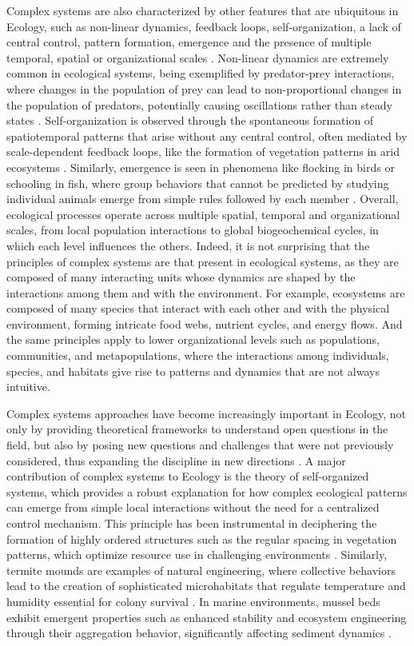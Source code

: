 Complex systems are also characterized by other features that are ubiquitous in
Ecology, such as non-linear dynamics, feedback loops, self-organization, a lack
of central control, pattern formation, emergence and the presence of multiple
temporal, spatial or organizational scales \cite{Bianconi_2023}. Non-linear
dynamics are extremely common in ecological systems, being exemplified by
predator-prey interactions, where changes in the population of prey can lead to
non-proportional changes in the population of predators, potentially causing
oscillations rather than steady states \cite{Lotka1925}. Self-organization is
observed through the spontaneous formation of spatiotemporal patterns that
arise without any central control, often mediated by scale-dependent feedback
loops, like the formation of vegetation patterns in arid ecosystems
\cite{Rietkerk2008}. Similarly, emergence is seen in phenomena like flocking in
birds or schooling in fish, where group behaviors that cannot be predicted by
studying individual animals emerge from simple rules followed by each member
\cite{Vicsek1995}. Overall, ecological processes operate across multiple
spatial, temporal and organizational scales, from local population interactions
to global biogeochemical cycles, in which each level influences the others.
Indeed, it is not surprising that the principles of complex systems are that
present in ecological systems, as they are composed of many interacting units
whose dynamics are shaped by the interactions among them and with the
environment. For example, ecosystems are composed of many species that
interact with each other and with the physical environment, forming intricate
food webs, nutrient cycles, and energy flows. And the same principles apply to
lower organizational levels such as populations, communities, and
metapopulations, where the interactions among individuals, species, and
habitats give rise to patterns and dynamics that are not always intuitive.

Complex systems approaches have become increasingly important in Ecology, not
only by providing theoretical frameworks to understand open questions in the
field, but also by posing new questions and challenges that were not previously
considered, thus expanding the discipline in new directions \cite{Milne1998}. A
major contribution of complex systems to Ecology is the theory of
self-organized systems, which provides a robust explanation for how
complex ecological patterns can emerge from simple local interactions without
the need for a centralized control mechanism. This principle has been
instrumental in deciphering the formation of highly ordered structures such as
the regular spacing in vegetation patterns, which optimize resource use in
challenging environments \cite{Tarnita2017}. Similarly, termite mounds are
examples of natural engineering, where collective behaviors lead to the
creation of sophisticated microhabitats that regulate temperature and humidity
essential for colony survival \cite{Heyde2021}. In marine environments, mussel
beds exhibit emergent properties such as enhanced stability and ecosystem
engineering through their aggregation behavior, significantly affecting
sediment dynamics \cite{Koppel2008}.


